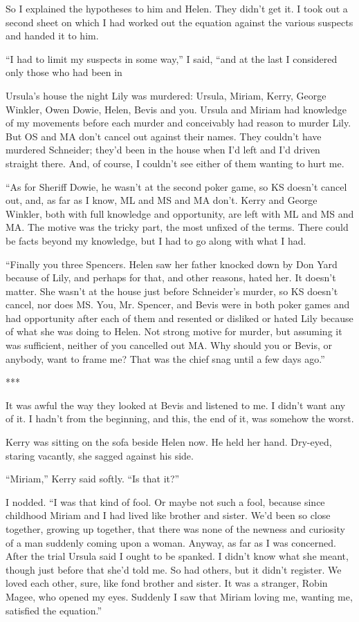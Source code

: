 \documentclass{novel}
\begin{document}
{So I explained the hypotheses to him and Helen. They didn’t get it. I took out a second sheet on which I had worked out the equation against the various suspects and handed it to him.

“I had to limit my suspects in some way,” I said, “and at the last I considered only those who had been in

Ursula’s house the night Lily was murdered: Ursula, Miriam, Kerry, George Winkler, Owen Dowie, Helen, Bevis and you. Ursula and Miriam had knowledge of my movements before each murder and conceivably had reason to murder Lily. But OS and MA don’t cancel out against their names. They couldn’t have murdered Schneider; they’d been in the house when I’d left and I’d driven straight there. And, of course, I couldn’t see either of them wanting to hurt me.

“As for Sheriff Dowie, he wasn’t at the second poker game, so KS doesn’t cancel out, and, as far as I know, ML and MS and MA don’t. Kerry and George Winkler, both with full knowledge and opportunity, are left with ML and MS and MA. The motive was the tricky part, the most unfixed of the terms. There could be facts beyond my knowledge, but I had to go along with what I had.

“Finally you three Spencers. Helen saw her father knocked down by Don Yard because of Lily, and perhaps for that, and other reasons, hated her. It doesn’t matter. She wasn’t at the house just before Schneider’s murder, so KS doesn’t cancel, nor does MS. You, Mr. Spencer, and Bevis were in both poker games and had opportunity after each of them and resented or disliked or hated Lily because of what she was doing to Helen. Not strong motive for murder, but assuming it was sufficient, neither of you cancelled out MA. Why should you or Bevis, or anybody, want to frame me? That was the chief snag until a few days ago.”

***

It was awful the way they looked at Bevis and listened to me. I didn’t want any of it. I hadn’t from the beginning, and this, the end of it, was somehow the worst.

Kerry was sitting on the sofa beside Helen now. He held her hand. Dry-eyed, staring vacantly, she sagged against his side.

“Miriam,” Kerry said softly. “Is that it?”

I nodded. “I was that kind of fool. Or maybe not such a fool, because since childhood Miriam and I had lived like brother and sister. We’d been so close together, growing up together, that there was none of the newness and curiosity of a man suddenly coming upon a woman. Anyway, as far as I was concerned. After the trial Ursula said I ought to be spanked. I didn’t know what she meant, though just before that she’d told me. So had others, but it didn’t register. We loved each other, sure, like fond brother and sister. It was a stranger, Robin Magee, who opened my eyes. Suddenly I saw that Miriam loving me, wanting me, satisfied the equation.”

}
\end{document}
